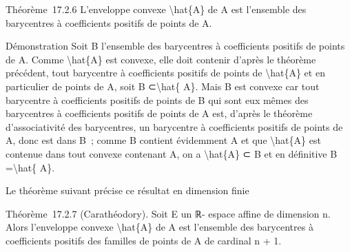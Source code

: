 \documentclass[]{article}
\begin{document}
Théorème~17.2.6 L'enveloppe convexe \textbackslash{}hat\{A\} de A est
l'ensemble des barycentres à coefficients positifs de points de A.

Démonstration Soit B l'ensemble des barycentres à coefficients positifs
de points de A. Comme \textbackslash{}hat\{A\} est convexe, elle doit
contenir d'après le théorème précédent, tout barycentre à coefficients
positifs de points de \textbackslash{}hat\{A\} et en particulier de
points de A, soit B ⊂\textbackslash{}hat\{ A\}. Mais B est convexe car
tout barycentre à coefficients positifs de points de B qui sont eux
mêmes des barycentres à coefficients positifs de points de A est,
d'après le théorème d'associativité des barycentres, un barycentre à
coefficients positifs de points de A, donc est dans B~; comme B contient
évidemment A et que \textbackslash{}hat\{A\} est contenue dans tout
convexe contenant A, on a \textbackslash{}hat\{A\} ⊂ B et en définitive
B =\textbackslash{}hat\{ A\}.

Le théorème suivant précise ce résultat en dimension finie

Théorème~17.2.7 (Carathéodory). Soit E un ℝ- espace affine de dimension
n. Alors l'enveloppe convexe \textbackslash{}hat\{A\} de A est
l'ensemble des barycentres à coefficients positifs des familles de
points de A de cardinal n + 1.
\end{document}
